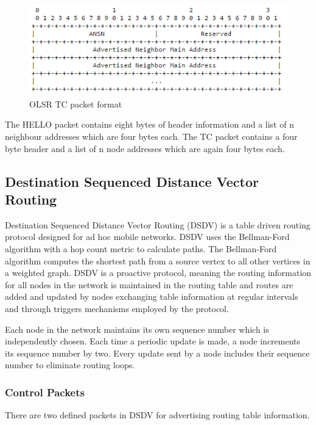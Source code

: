     \FloatBarrier
    \begin{figure}[ht]
      \includegraphics[scale=0.75]{Images/chapter2/olsr_tc.png}
      \caption{OLSR TC packet format}
      \label{fig:olsr_tc}
    \end{figure}
    \FloatBarrier

    The HELLO packet contains eight bytes of header information and a list of n neighbour
    addresses which are four bytes each. The TC packet contains a four byte header and
    a list of n node addresses which are again four bytes each.

      \subsection{Destination Sequenced Distance Vector Routing}
    Destination Sequenced Distance Vector Routing (DSDV) \cite{DSDV} is a table driven
    routing protocol designed for ad hoc mobile networks. DSDV uses the Bellman-Ford algorithm with a hop count
    metric to calculate paths. The Bellman-Ford algorithm \cite{bellman} computes the shortest
    path from a source vertex to all other vertices in a weighted graph.
    DSDV is a proactive protocol, meaning the routing information for all nodes
    in the network is maintained in the routing table and routes are added
    and updated by nodes exchanging table information at regular intervals and
    through triggers mechanisms employed by the protocol.

    Each node in the network maintains its own sequence number which is independently
    chosen. Each time a periodic update is made, a node increments its sequence
    number by two. Every update sent by a node includes their sequence number
    to eliminate routing loops.

      \subsubsection{Control Packets}
    There are two defined packets in DSDV for advertising routing table information.

